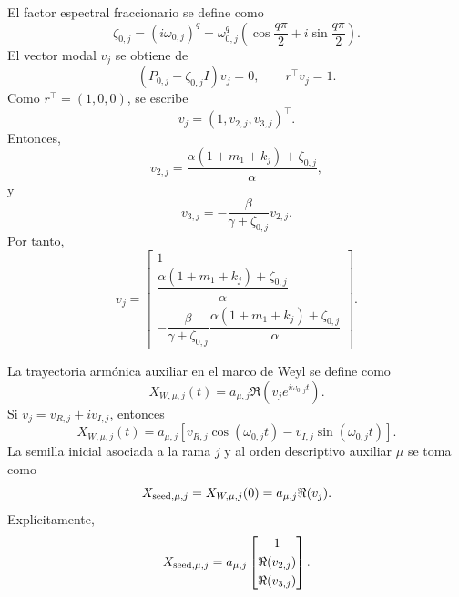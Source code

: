 El factor espectral fraccionario se define como
\begin{equation}
\label{eq:zeta_mu_machado}
\zeta_{0,j}
=
(i\omega_{0,j})^q
=
\omega_{0,j}^q
\left(
\cos\frac{q\pi}{2}
+
i\sin\frac{q\pi}{2}
\right).
\end{equation}
El vector modal \(v_j\) se obtiene de
\begin{equation}
\label{eq:modal_problem_mu_machado}
(P_{0,j}-\zeta_{0,j}I)v_j=0,
\qquad
r^\top v_j=1.
\end{equation}
Como \(r^\top=(1,0,0)\), se escribe
\[
v_j=(1,v_{2,j},v_{3,j})^\top.
\]
Entonces,
\begin{equation}
\label{eq:v2_machado}
v_{2,j}
=
\frac{\alpha(1+m_1+k_j)+\zeta_{0,j}}{\alpha},
\end{equation}
y
\begin{equation}
\label{eq:v3_machado}
v_{3,j}
=
-\frac{\beta}{\gamma+\zeta_{0,j}}v_{2,j}.
\end{equation}
Por tanto,
\begin{equation}
\label{eq:v_machado}
v_j
=
\begin{bmatrix}
1\\[1mm]
\dfrac{\alpha(1+m_1+k_j)+\zeta_{0,j}}{\alpha}\\[3mm]
-\dfrac{\beta}{\gamma+\zeta_{0,j}}
\dfrac{\alpha(1+m_1+k_j)+\zeta_{0,j}}{\alpha}
\end{bmatrix}.
\end{equation}

La trayectoria armónica auxiliar en el marco de Weyl se define como
\begin{equation}
\label{eq:XW_mu_machado}
X_{W,\mu,j}(t)
=
a_{\mu,j}\Re\left(v_je^{i\omega_{0,j}t}\right).
\end{equation}
Si \(v_j=v_{R,j}+iv_{I,j}\), entonces
\begin{equation}
\label{eq:XW_mu_real_machado}
X_{W,\mu,j}(t)
=
a_{\mu,j}
\left[
v_{R,j}\cos(\omega_{0,j}t)
-
v_{I,j}\sin(\omega_{0,j}t)
\right].
\end{equation}
La semilla inicial asociada a la rama \(j\) y al orden descriptivo auxiliar
\(\mu\) se toma como
\begin{equation}
\label{eq:Xseed_mu_machado}
X_{{\rm seed},\mu,j}
=
X_{W,\mu,j}(0)
=
a_{\mu,j}\Re(v_j).
\end{equation}
Explícitamente,
\begin{equation}
\label{eq:Xseed_mu_explicit_machado}
X_{{\rm seed},\mu,j}
=
a_{\mu,j}
\begin{bmatrix}
1\\[1mm]
\Re(v_{2,j})\\[1mm]
\Re(v_{3,j})
\end{bmatrix}.
\end{equation}

